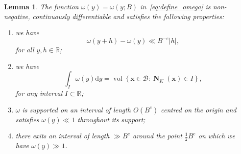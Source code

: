 \documentclass[11pt,letterpaper]{amsart}
\renewcommand{\d}{\mathrm{d}}
\newtheorem{lemma}[theorem]{Lemma}
\theoremstyle{definition}
\numberwithin{equation}{section}
\newcommand\RR{\mathbb{R}}
\newcommand{\x}{\mathbf{x}}
\DeclareMathOperator{\vol}{vol}
\DeclareMathOperator{\nf}{\mathbf{N}}
\newcommand{\0}{\mathbf{0}}
\begin{document}
\begin{lemma}\label{lem:props-om}
The
function $\omega(y)=\omega(y;B)$ 
in~\eqref{eq:define_omega} is non-negative,  continuously differentiable and satisfies the following properties:
\begin{enumerate}
\item[(i)] we have 
$$
\omega(y+h)-\omega(y)\ll B^{-e}|h|,
$$ 
for all $y,h\in \RR$;
\item[(ii)]
we have 
$$
\int_I\omega(y)\d y=
\vol\left\{
\x\in \mathcal{B}: \nf_K(\x)\in I
\right\},
$$
for any interval $I\subset \RR$;
\item[(iii)]
$\omega$ 
 is supported on an interval of length $O(B^e)$ centred on the origin
 and
satisfies $\omega(y)\ll 1$ throughout its support;
\item[(iv)]
there exits an interval of length  $\gg B^{e}$ around the point 
$\frac{1}{2}B^{e}$  on which we have $\omega(y)\gg 1$.
\end{enumerate}
\end{lemma}
\end{document}
